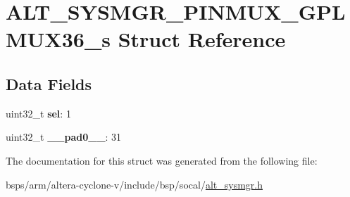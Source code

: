 \hypertarget{structALT__SYSMGR__PINMUX__GPLMUX36__s}{}\section{A\+L\+T\+\_\+\+S\+Y\+S\+M\+G\+R\+\_\+\+P\+I\+N\+M\+U\+X\+\_\+\+G\+P\+L\+M\+U\+X36\+\_\+s Struct Reference}
\label{structALT__SYSMGR__PINMUX__GPLMUX36__s}
\subsection*{Data Fields}
\begin{DoxyCompactItemize}
\item 
\mbox{\label{structALT__SYSMGR__PINMUX__GPLMUX36__s_a1672d1e13f2b3010bb546e0aa0ea0021}} 
uint32\+\_\+t {\bfseries sel}\+: 1
\item 
\mbox{\label{structALT__SYSMGR__PINMUX__GPLMUX36__s_a5bee343f863292fa1c8c155ed2c0a354}} 
uint32\+\_\+t {\bfseries \+\_\+\+\_\+pad0\+\_\+\+\_\+}\+: 31
\end{DoxyCompactItemize}


The documentation for this struct was generated from the following file\+:\begin{DoxyCompactItemize}
\item 
bsps/arm/altera-\/cyclone-\/v/include/bsp/socal/\mbox{\hyperlink{alt__sysmgr_8h}{alt\+\_\+sysmgr.\+h}}\end{DoxyCompactItemize}
